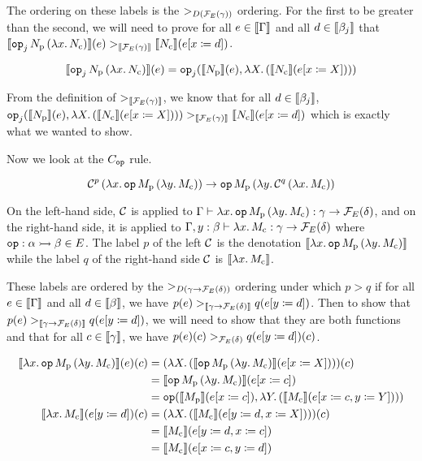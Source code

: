 The ordering on these labels is the $>_{D(\mathcal{F}_E(\gamma))}$ ordering. For
the first to be greater than the second, we will need to prove for all
$e \in \llbracket \Gamma \rrbracket$ and all $d \in \llbracket \beta_j \rrbracket$ that
$\llbracket \mathtt{op}_j\,N_{\mathrm{p}}\,(\lambda x.\, N_{\mathrm{c}}) \rrbracket(e)
>_{\llbracket \mathcal{F}_E(\gamma) \rrbracket} \llbracket N_{\mathrm{c}} \rrbracket(e[x \coloneqq d])$.

$$
\llbracket \mathtt{op}_j\,N_{\mathrm{p}}\,(\lambda x.\, N_{\mathrm{c}}) \rrbracket(e) =
\mathtt{op}_j(\llbracket N_{\mathrm{p}} \rrbracket(e), \lambda X.\, ({\llbracket N_{\mathrm{c}} \rrbracket}(e[x \coloneqq X])))
$$

From the definition of $>_{\llbracket \mathcal{F}_E(\gamma) \rrbracket}$, we know that for all
$d \in \llbracket \beta_j \rrbracket$,
$\mathtt{op}_j(\llbracket N_{\mathrm{p}} \rrbracket(e), \lambda X.\, ({\llbracket N_{\mathrm{c}} \rrbracket}(e[x \coloneqq X])))
>_{\llbracket \mathcal{F}_E(\gamma) \rrbracket} \llbracket N_{\mathrm{c}} \rrbracket(e[x \coloneqq d])$ which is exactly
what we wanted to show.

Now we look at the $C_{\mathtt{op}}$ rule.

$$
\mathcal{C}^p\,(\lambda x.\, \mathtt{op}\,M_{\mathrm{p}}\,(\lambda y.\, M_{\mathrm{c}}))
\to \mathtt{op}\,M_{\mathrm{p}}\,(\lambda y.\, \mathcal{C}^q\,(\lambda x.\, M_{\mathrm{c}}))
$$

On the left-hand side, $\mathcal{C}$ is applied to
$\Gamma \vdash \lambda x.\, \mathtt{op}\,M_{\mathrm{p}}\,(\lambda y.\, M_{\mathrm{c}}) :
\gamma \to \mathcal{F}_E(\delta)$, and on the right-hand side, it is applied to
$\Gamma, y : \beta \vdash \lambda x.\, M_{\mathrm{c}} : \gamma \to \mathcal{F}_E(\delta)$
where $\mathtt{op} : \alpha \rightarrowtail \beta \in E$. The label $p$ of the left $\mathcal{C}$
is the denotation
$\llbracket \lambda x.\, \mathtt{op}\,M_{\mathrm{p}}\,(\lambda y.\, M_{\mathrm{c}}) \rrbracket$ while the
label $q$ of the right-hand side $\mathcal{C}$ is $\llbracket \lambda x.\, M_{\mathrm{c}} \rrbracket$.

These labels are ordered by the $>_{D(\gamma \to \mathcal{F}_E(\delta))}$ ordering
under which $p > q$ if for all $e \in \llbracket \Gamma \rrbracket$ and all
$d \in \llbracket \beta \rrbracket$, we have
$p(e) >_{\llbracket \gamma \to \mathcal{F}_E(\delta) \rrbracket} q(e[y \coloneqq d])$. Then to show
that $p(e) >_{\llbracket \gamma \to \mathcal{F}_E(\delta) \rrbracket} q(e[y \coloneqq d])$, we will
need to show that they are both functions and that for all
$c \in \llbracket \gamma \rrbracket$, we have
$p(e)(c) >_{\mathcal{F}_E(\delta)} q(e[y \coloneqq d])(c)$.

\begin{align*}
  \llbracket \lambda x.\, \mathtt{op}\,M_{\mathrm{p}}\,(\lambda y.\, M_{\mathrm{c}}) \rrbracket(e)(c)
  &= (\lambda X.\, (\llbracket \mathtt{op}\,M_{\mathrm{p}}\,(\lambda y.\, M_{\mathrm{c}}) \rrbracket(e[x \coloneqq X])))(c) \\
  &= \llbracket \mathtt{op}\,M_{\mathrm{p}}\,(\lambda y.\, M_{\mathrm{c}}) \rrbracket(e[x \coloneqq c]) \\
  &= \mathtt{op}(\llbracket M_{\mathrm{p}} \rrbracket(e[x \coloneqq c]), \lambda Y.\, (\llbracket M_{\mathrm{c}} \rrbracket(e[x \coloneqq c, y \coloneqq Y]))) \\
  \llbracket \lambda x.\, M_{\mathrm{c}} \rrbracket(e[y \coloneqq d])(c)
  &= (\lambda X.\, (\llbracket M_{\mathrm{c}} \rrbracket(e[y \coloneqq d, x \coloneqq X])))(c) \\
  &= \llbracket M_{\mathrm{c}} \rrbracket(e[y \coloneqq d, x \coloneqq c]) \\
  &= \llbracket M_{\mathrm{c}} \rrbracket(e[x \coloneqq c, y \coloneqq d])
\end{align*}


